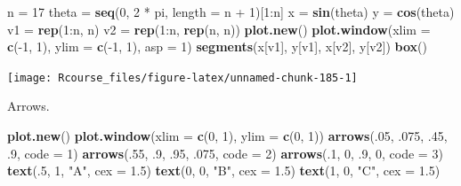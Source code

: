 \documentclass[]{book}
\newenvironment{Shaded}{\begin{snugshade}}{\end{snugshade}}
\newcommand{\KeywordTok}[1]{\textcolor[rgb]{0.13,0.29,0.53}{\textbf{{#1}}}}
\newcommand{\DataTypeTok}[1]{\textcolor[rgb]{0.13,0.29,0.53}{{#1}}}
\newcommand{\DecValTok}[1]{\textcolor[rgb]{0.00,0.00,0.81}{{#1}}}
\newcommand{\FloatTok}[1]{\textcolor[rgb]{0.00,0.00,0.81}{{#1}}}
\newcommand{\StringTok}[1]{\textcolor[rgb]{0.31,0.60,0.02}{{#1}}}
\newcommand{\NormalTok}[1]{{#1}}
\theoremstyle{definition}
\theoremstyle{definition}
\theoremstyle{remark}
\begin{document}
\begin{Shaded}
\begin{Highlighting}[]
\NormalTok{n =}\StringTok{ }\DecValTok{17}
\NormalTok{theta =}\StringTok{ }\KeywordTok{seq}\NormalTok{(}\DecValTok{0}\NormalTok{, }\DecValTok{2} \NormalTok{*}\StringTok{ }\NormalTok{pi, }\DataTypeTok{length =} \NormalTok{n +}\StringTok{ }\DecValTok{1}\NormalTok{)[}\DecValTok{1}\NormalTok{:n]}
\NormalTok{x =}\StringTok{ }\KeywordTok{sin}\NormalTok{(theta)}
\NormalTok{y =}\StringTok{ }\KeywordTok{cos}\NormalTok{(theta)}
\NormalTok{v1 =}\StringTok{ }\KeywordTok{rep}\NormalTok{(}\DecValTok{1}\NormalTok{:n, n)}
\NormalTok{v2 =}\StringTok{ }\KeywordTok{rep}\NormalTok{(}\DecValTok{1}\NormalTok{:n, }\KeywordTok{rep}\NormalTok{(n, n))}
\KeywordTok{plot.new}\NormalTok{()}
\KeywordTok{plot.window}\NormalTok{(}\DataTypeTok{xlim =} \KeywordTok{c}\NormalTok{(-}\DecValTok{1}\NormalTok{, }\DecValTok{1}\NormalTok{), }\DataTypeTok{ylim =} \KeywordTok{c}\NormalTok{(-}\DecValTok{1}\NormalTok{, }\DecValTok{1}\NormalTok{), }\DataTypeTok{asp =} \DecValTok{1}\NormalTok{)}
\KeywordTok{segments}\NormalTok{(x[v1], y[v1], x[v2], y[v2])}
\KeywordTok{box}\NormalTok{()}
\end{Highlighting}
\end{Shaded}

\texttt{[image: Rcourse\_files/figure-latex/unnamed-chunk-185-1]}

Arrows.

\begin{Shaded}
\begin{Highlighting}[]
\KeywordTok{plot.new}\NormalTok{()}
\KeywordTok{plot.window}\NormalTok{(}\DataTypeTok{xlim =} \KeywordTok{c}\NormalTok{(}\DecValTok{0}\NormalTok{, }\DecValTok{1}\NormalTok{), }\DataTypeTok{ylim =} \KeywordTok{c}\NormalTok{(}\DecValTok{0}\NormalTok{, }\DecValTok{1}\NormalTok{))}
\KeywordTok{arrows}\NormalTok{(.}\DecValTok{05}\NormalTok{, .}\DecValTok{075}\NormalTok{, .}\DecValTok{45}\NormalTok{, .}\DecValTok{9}\NormalTok{, }\DataTypeTok{code =} \DecValTok{1}\NormalTok{)}
\KeywordTok{arrows}\NormalTok{(.}\DecValTok{55}\NormalTok{, .}\DecValTok{9}\NormalTok{, .}\DecValTok{95}\NormalTok{, .}\DecValTok{075}\NormalTok{, }\DataTypeTok{code =} \DecValTok{2}\NormalTok{)}
\KeywordTok{arrows}\NormalTok{(.}\DecValTok{1}\NormalTok{, }\DecValTok{0}\NormalTok{, .}\DecValTok{9}\NormalTok{, }\DecValTok{0}\NormalTok{, }\DataTypeTok{code =} \DecValTok{3}\NormalTok{)}
\KeywordTok{text}\NormalTok{(.}\DecValTok{5}\NormalTok{, }\DecValTok{1}\NormalTok{, }\StringTok{"A"}\NormalTok{, }\DataTypeTok{cex =} \FloatTok{1.5}\NormalTok{)}
\KeywordTok{text}\NormalTok{(}\DecValTok{0}\NormalTok{, }\DecValTok{0}\NormalTok{, }\StringTok{"B"}\NormalTok{, }\DataTypeTok{cex =} \FloatTok{1.5}\NormalTok{)}
\KeywordTok{text}\NormalTok{(}\DecValTok{1}\NormalTok{, }\DecValTok{0}\NormalTok{, }\StringTok{"C"}\NormalTok{, }\DataTypeTok{cex =} \FloatTok{1.5}\NormalTok{)}
\end{Highlighting}
\end{Shaded}
\end{document}
